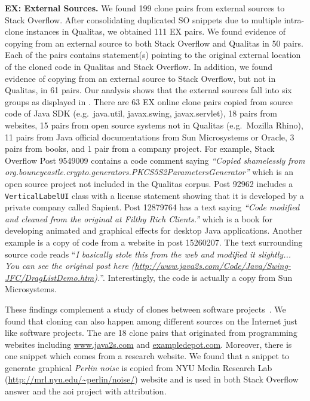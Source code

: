 \documentclass[10pt,journal,compsoc]{IEEEtran}
\begin{document}
\textbf{EX: External Sources.} We found 199 clone pairs from external sources to
Stack Overflow. After consolidating duplicated SO snippets due to multiple
intra-clone instances in Qualitas, we obtained 111 EX pairs. We found
evidence of copying from an external source to both Stack
Overflow and Qualitas in 50 pairs. Each of the pairs contains
statement(s) pointing to the original external location of the cloned
code in Qualitas and Stack Overflow. In addition, we found evidence
of copying from an external source to Stack Overflow, but not in
Qualitas, in 61 pairs. 
Our
analysis shows that the external sources fall into six groups as displayed in
. There are 63 EX online clone pairs copied
from source code of Java SDK (e.g.~\textsf{java.util}, \textsf{javax.swing}, \textsf{javax.servlet}), 
18 pairs from websites, 15 pairs from open
source systems not in Qualitas (e.g.~\textsf{Mozilla
	Rhino}), 11 pairs from Java official documentations from Sun
Microsystems or Oracle, 3 pairs from books, and 1 pair from a company
project. For example, Stack Overflow Post 9549009 contains a code comment saying
\textit{``Copied shamelessly from
	org.bouncycastle.crypto.generators.PKCS5S2ParametersGenerator''} which is an
open source project not included in the Qualitas corpus. Post 92962 includes a {\small\texttt{VerticalLabelUI}}
class with a license statement showing that it is developed by a private company
called \textsf{Sapient}. Post 12879764 has a text saying \textit{``Code modified
	and cleaned from the original at Filthy Rich Clients.''} which is a book for
developing animated and graphical effects for desktop Java applications. Another
example is a copy of code from a website in post 15260207. The text surrounding
source code reads ``\textit{I basically stole this from the web and modified it
	slightly... You can see the original post here
	(\url{http://www.java2s.com/Code/Java/Swing-JFC/DragListDemo.htm}).}''.
Interestingly, the code is actually a copy from Sun Microsystems.

These findings complement a study of clones between software
projects~\cite{Svajlenko2014}. We found that cloning can also happen among
different sources on the Internet just like software projects. The are 18 clone
pairs that originated from programming websites including \url{www.java2s.com}
and \url{exampledepot.com}. Moreover, there is one snippet which comes from a
research website. We found that a snippet to generate graphical \textit{Perlin
	noise} is copied from NYU Media Research Lab
(\url{http://mrl.nyu.edu/~perlin/noise/}) website and is used in both Stack Overflow
answer and the \textsf{aoi} project with attribution. 
\end{document}
